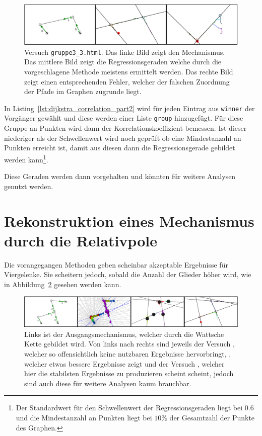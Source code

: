 \begin{figure}
    \centering
    \includegraphics[width=\textwidth]{gfx/correlation_edit.png}
    \caption[Versuch \lstinline{gruppe3_3.html}]{Versuch \lstinline{gruppe3_3.html}. Das linke Bild zeigt den Mechanismus. Das mittlere Bild zeigt die Regressionsgeraden welche durch die vorgeschlagene Methode meistens ermittelt werden. Das rechte Bild zeigt einen entsprechenden Fehler, welcher der falschen Zuordnung der Pfade im Graphen zugrunde liegt.}
    \label{fig:gruppe3_3}
\end{figure}

In Listing~\ref{lst:dijkstra_correlation_part2} wird für jeden Eintrag aus \lstinline{winner} der Vorgänger gewählt und diese werden einer Liste \lstinline{group} hinzugefügt.
Für diese Gruppe an Punkten wird dann der Korrelationskoeffizient bemessen.
Ist dieser niederiger als der Schwellenwert wird noch geprüft ob eine Mindestanzahl an Punkten erreicht ist, damit aus diesen dann die Regressionsgerade gebildet werden kann\footnote{Der Standardwert für den Schwellenwert der Regressionsgeraden liegt bei $0.6$ und die Mindestanzahl an Punkten liegt bei $10\%$ der Gesamtzahl der Punkte des Graphen.}.

Diese Geraden werden dann vorgehalten und könnten für weitere Analysen genutzt werden.

\section{Rekonstruktion eines Mechanismus durch die Relativpole}

Die vorangegangen Methoden geben scheinbar akzeptable Ergebnisse für Viergelenke.
Sie scheitern jedoch, sobald die Anzahl der Glieder höher wird, wie in Abbildung~\ref{fig:gruppe1_3_2_6_3_4} gesehen werden kann.

\begin{figure}
    \includegraphics[width=\textwidth]{gfx/gruppe_failed_edit.png}
    \caption[Versuche ,  und .]{Links ist der Ausgangsmechanismus, welcher durch die Wattsche Kette gebildet wird. Von links nach rechts sind jeweils der Versuch , welcher so offensichtlich keine nutzbaren Ergebnisse hervorbringt, , welcher etwas bessere Ergebnisse zeigt und der Versuch , welcher hier die stabilsten Ergebnisse zu produzieren scheint scheint, jedoch sind auch diese für weitere Analysen kaum brauchbar.}
    \label{fig:gruppe1_3_2_6_3_4}
\end{figure}

